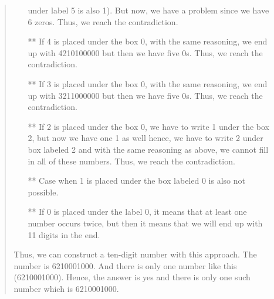 \documentclass[12pt, a4paper]{article}                      %
\begin{document}
\begin{itemize}
\begin{quote}
\begin{itemize}
under label 5 is also 1). But now, we have a problem since we have 6 zeros. Thus, we reach the contradiction.
\item[**]
If 4 is placed under the box 0, with the same reasoning, we end up with 4210100000 but then we have five 0s.
Thus, we reach the contradiction.
\item[**]
If 3 is placed under the box 0, with the same reasoning, we end up with 3211000000 but then we have five 0s.
Thus, we reach the contradiction.
\item[**]
If 2 is placed under the box 0, we have to write 1 under the box 2, but now we have one 1 as well hence, we have
to write 2 under box labeled 2 and with the same reasoning as above, we cannot fill in all of these numbers.
Thus, we reach the contradiction.
\item[**]
Case when 1 is placed under the box labeled 0 is also not possible.
\item[**]
If 0 is placed under the label 0, it means that at least one number occurs twice, but then
it means that we will end up with 11 digits in the end.
\\
\end{itemize}
Thus, we can construct a ten-digit number with this approach. The number is 6210001000.
And there is only one number like this (6210001000). Hence, the answer is yes and there
is only one such number which is 6210001000.
\end{quote}
\end{itemize}
\end{document}
